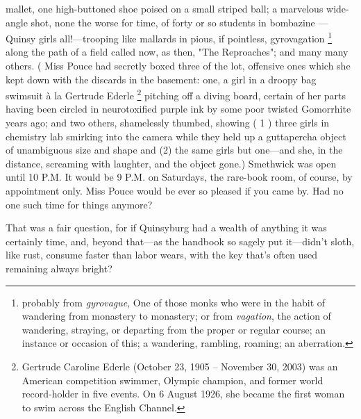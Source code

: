 mallet, one high-buttoned shoe poised on a small striped ball; a marvelous 
wide-angle shot, none the worse for time, of forty or so students in bombazine
---Quinsy girls all!---trooping like mallards 
in pious, if pointless, gyrovagation 
\footnote{ \textdbend probably from \textit{gyrovague}, One of those monks who
were in the habit of wandering from monastery to monastery; or from
\textit{vagation}, the action of wandering, straying, or departing from the
proper or regular course; an instance or occasion of this; a wandering,
rambling, roaming; an aberration.
}
along the path of a field called now, as then,
"The Reproaches"; and many many others. ( Miss Pouce had secretly boxed three of
the lot, offensive ones which she kept down with the discards in the basement:
one, a girl in a droopy 
bag swimsuit à la Gertrude Ederle 
\footnote{Gertrude Caroline Ederle (October 23, 1905 – November 30, 2003) was an
American competition swimmer, Olympic champion, and former world record-holder
in five events. On 6 August 1926, she became the first woman to swim across the
English Channel.
}
pitching off a diving board, certain of her parts having been circled in 
neurotoxified purple ink by some poor twisted Gomorrhite 
years ago; and two others, shamelessly thumbed,
showing ( 1 ) three girls in chemistry lab smirking 
into the camera while they held up a guttapercha 
object of unambiguous size and shape and (2) the same
girls but one---and she, in the distance, screaming with laughter, and the object
gone.) Smethwick was open until 10 P.M. It would be 9 P.M. on Saturdays, the
rare-book room, of course, by appointment only. Miss Pouce would be ever so
pleased if you came by. Had no one such time for things anymore?

  That was a fair question, for if Quinsyburg had a wealth of anything it was
certainly time, and, beyond that---as the handbook so sagely put it---didn't 
sloth,
like rust, consume faster than labor wears, with the key that's often used
remaining always bright?

